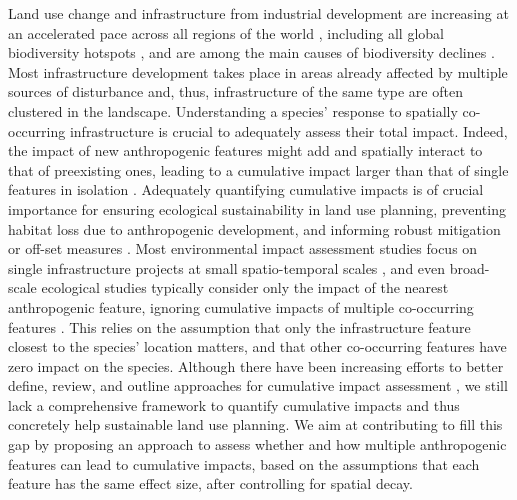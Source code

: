 \documentclass[titlepage]{article}
\begin{document}
Land use change and infrastructure from industrial development are increasing at an accelerated pace across all regions of the world \citep{venter_sixteen_2016,ibisch_global_2016}, including all global biodiversity hotspots \citep{sloan_remaining_2014}, and are among the main causes of biodiversity declines \citep{benitez-lopez_impacts_2010,newbold_global_2015}. Most infrastructure development takes place in areas already affected by multiple sources of disturbance \citep{barber_roads_2014} and, thus, infrastructure of the same type are often clustered in the landscape. Understanding a species' response to spatially co-occurring infrastructure is crucial to adequately assess their total impact. Indeed, the impact of new anthropogenic features might add and spatially interact to that of preexisting ones, leading to a cumulative impact larger than that of 
single features in isolation \citep[Box 1; ][]{naugle_unifying_2011}.  
Adequately quantifying cumulative impacts is of crucial importance for ensuring ecological sustainability in land use planning, preventing habitat loss due to anthropogenic development, and informing robust mitigation or off-set measures \citep{gillingham_integration_2016, laurance_roads_2017}. Most environmental impact assessment studies focus on single infrastructure projects at small spatio-temporal scales \citep{johnson_regulating_2011}, and even broad-scale ecological studies typically consider only the impact of the nearest anthropogenic feature, ignoring cumulative impacts of multiple co-occurring features \citep[e.g.][]{torres_assessing_2016}. This relies on the assumption that only the infrastructure feature closest to the species' location matters, and that other co-occurring features have zero impact on the species. Although there have been increasing efforts to better define, review, and outline approaches for cumulative impact assessment \citep{naugle_unifying_2011,gillingham_integration_2016}, we still lack a comprehensive framework to quantify cumulative impacts and thus concretely help sustainable land use planning. We aim at contributing to fill this gap by proposing an approach to assess whether and how multiple anthropogenic features can lead to cumulative impacts, based on the assumptions that each feature has the same effect size, after controlling for spatial decay.
\end{document}
